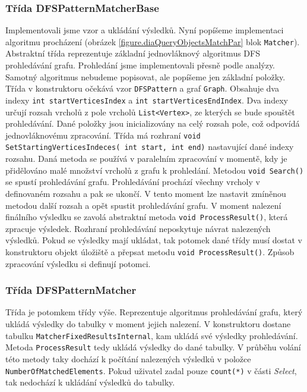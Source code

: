 \subsubsection{Třída DFSPatternMatcherBase}

Implementovali jsme vzor a ukládání výsledků.
Nyní popíšeme implementaci algoritmu procházení (obrázek \ref{figure.diaQueryObjectsMatchPar} blok \texttt{Matcher}).
Abstraktní třída reprezentuje základní jednovláknový algoritmus DFS prohledávání grafu.
Prohledání jsme implementovali přesně podle analýzy.
Samotný algoritmus nebudeme popisovat, ale popíšeme jen základní položky.
Třída v konstruktoru očekává vzor \texttt{DFSPattern} a graf \texttt{Graph}.
Obsahuje dva indexy \texttt{int startVerticesIndex} a \texttt{int startVerticesEndIndex}.
Dva indexy určují rozsah vrcholů z pole vrcholů \texttt{List<Vertex>}, ze kterých se bude spouštět prohledávání.
Dané položky jsou inicializovány na celý rozsah pole, což odpovídá jednovláknovému zpracování.
Třída má rozhraní \texttt{void SetStartingVerticesIndeces( int start, int end)} nastavující dané indexy rozsahu.
Daná metoda se používá v paralelním zpracování v momentě, kdy je přidělováno malé množství vrcholů z grafu k prohledání.
Metodou \texttt{void Search()} se spustí prohledávání grafu.
Prohledávání prochází všechny vrcholy v definovaném rozsahu a pak se ukončí.
V tento moment lze nastavit zmíněnou metodou další rozsah a opět spustit prohledávání grafu.
V moment nalezení finálního výsledku se zavolá abstraktní metoda \texttt{void ProcessResult()}, která zpracuje výsledek.
Rozhraní prohledávání neposkytuje návrat nalezených výsledků.
Pokud se výsledky mají ukládat, tak potomek dané třídy musí dostat v konstruktoru objekt úložiště a přepsat metodu \texttt{void ProcessResult()}.
Způsob zpracování výsledku si definují potomci.

\subsubsection{Třída DFSPatternMatcher}

Třída je potomkem třídy výše.
Reprezentuje algoritmus prohledávání grafu, který ukládá výsledky do tabulky v moment jejich nalezení.
V konstruktoru dostane tabulku \texttt{MatcherFixedResultsInternal}, kam ukládá své výsledky prohledávání.
Metoda \texttt{ProcessResult} tedy ukládá výsledky do dané tabulky.
V průběhu volání této metody taky dochází k počítání nalezených výsledků v položce \texttt{NumberOfMatchedElements}.
Pokud uživatel zadal pouze \texttt{count(*)} v části \textit{Select}, tak nedochází k ukládání výsledků do tabulky.

